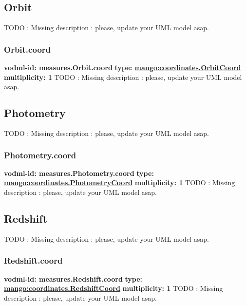   \subsection{Orbit}
  \label{sect:measures.Orbit}
    TODO : Missing description : please, update your UML model asap.

    \subsubsection{Orbit.coord}
      \textbf{vodml-id: measures.Orbit.coord} \newline
      \textbf{type: \hyperref[sect:coordinates.OrbitCoord]{mango:coordinates.OrbitCoord}} \newline
      \textbf{multiplicity: 1} \newline 
      TODO : Missing description : please, update your UML model asap.

  \subsection{Photometry}
  \label{sect:measures.Photometry}
    TODO : Missing description : please, update your UML model asap.

    \subsubsection{Photometry.coord}
      \textbf{vodml-id: measures.Photometry.coord} \newline
      \textbf{type: \hyperref[sect:coordinates.PhotometryCoord]{mango:coordinates.PhotometryCoord}} \newline
      \textbf{multiplicity: 1} \newline 
      TODO : Missing description : please, update your UML model asap.

  \subsection{Redshift}
  \label{sect:measures.Redshift}
    TODO : Missing description : please, update your UML model asap.

    \subsubsection{Redshift.coord}
      \textbf{vodml-id: measures.Redshift.coord} \newline
      \textbf{type: \hyperref[sect:coordinates.RedshiftCoord]{mango:coordinates.RedshiftCoord}} \newline
      \textbf{multiplicity: 1} \newline 
      TODO : Missing description : please, update your UML model asap.

